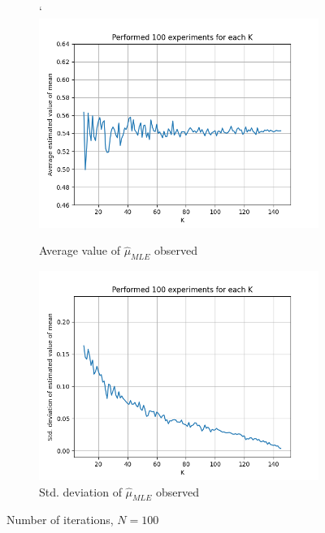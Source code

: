 \documentclass[fleqn, 11pt]{article}
\begin{document}
\newpage
\begin{figure}[H]
    \centering
    \begin{subfigure}[H]{0.49\textwidth}
        \centering`
        \includegraphics[width=\textwidth]{P1_mu/avgs_100.png}
        \caption[]{Average value of $\hat{\mu}_{MLE}$ observed}
    \end{subfigure}
    \begin{subfigure}[H]{0.49\textwidth}
        \centering
        \includegraphics[width=\textwidth]{P1_mu/stds_100.png}
        \caption[]{Std. deviation of $\hat{\mu}_{MLE}$ observed}
    \end{subfigure}
    \caption{Number of iterations, $N = 100$}
\end{figure}
\end{document}
